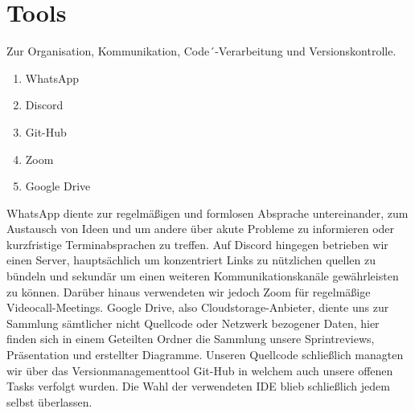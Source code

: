 \section{Tools}
Zur Organisation, Kommunikation, Code´-Verarbeitung und Versionskontrolle.

\begin{enumerate}
\item WhatsApp
\item Discord
\item Git-Hub
\item Zoom
\item Google Drive
\end{enumerate}
WhatsApp diente zur regelmäßigen und formlosen Absprache untereinander, zum Austausch von Ideen und um andere über akute Probleme zu informieren oder kurzfristige Terminabsprachen zu treffen. Auf Discord hingegen betrieben wir einen Server, hauptsächlich um konzentriert Links zu nützlichen quellen zu bündeln und sekundär um einen weiteren Kommunikationskanäle gewährleisten zu können. Darüber hinaus verwendeten wir jedoch Zoom für regelmäßige Videocall-Meetings. Google Drive, also Cloudstorage-Anbieter, diente uns zur Sammlung sämtlicher nicht Quellcode oder Netzwerk bezogener Daten, hier finden sich in einem Geteilten Ordner die Sammlung unsere Sprintreviews, Präsentation und erstellter Diagramme. Unseren Quellcode schließlich managten wir über das Versionmanagementtool Git-Hub in welchem auch unsere offenen Tasks verfolgt wurden. Die Wahl der verwendeten IDE blieb schließlich jedem selbst überlassen.
